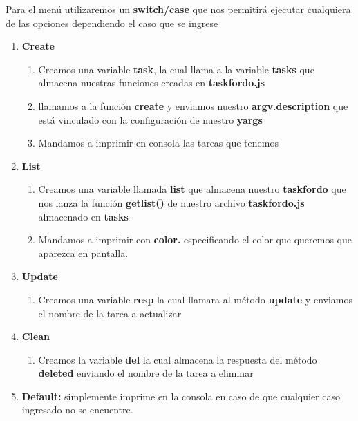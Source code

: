 \documentclass{report}
\begin{document}
Para el menú utilizaremos un \textbf{switch/case} que nos permitirá ejecutar cualquiera de las opciones dependiendo el caso que se ingrese

\begin{enumerate}
  \item \textbf{Create}
  \begin{enumerate}
    \item Creamos una variable \textbf{task}, la cual llama a la variable \textbf{tasks} que almacena nuestras funciones creadas en \textbf{task\-for\-do.js}
    \item llamamos a la función \textbf{create} y enviamos nuestro \textbf{argv.description} que está vinculado con la configuración de nuestro \textbf{yargs}  
    \item Mandamos a imprimir en consola las tareas que tenemos
  \end{enumerate}
  \item \textbf{List}
  \begin{enumerate}
    \item Creamos una variable llamada \textbf{list} que almacena nuestro \textbf{taskfordo} que nos lanza la función \textbf{getlist()} de nuestro archivo \textbf{task\-for\-do.js} almacenado en \textbf{tasks}
    \item Mandamos a imprimir con \textbf{color.} especificando el color que queremos que aparezca en pantalla.
  \end{enumerate}
  \item \textbf{Update}
  \begin{enumerate}
    \item Creamos una variable \textbf{resp} la cual llamara al método \textbf{update} y enviamos el nombre de la tarea a actualizar
  \end{enumerate}
  \item \textbf{Clean}
  \begin{enumerate}
    \item Creamos la variable \textbf{del} la cual almacena la respuesta del método \textbf{deleted} enviando el nombre de la tarea a eliminar
  \end{enumerate}
  \item \textbf{Default:} simplemente imprime en la consola en caso de que cualquier caso ingresado no se encuentre.
\end{enumerate}
\end{document}
